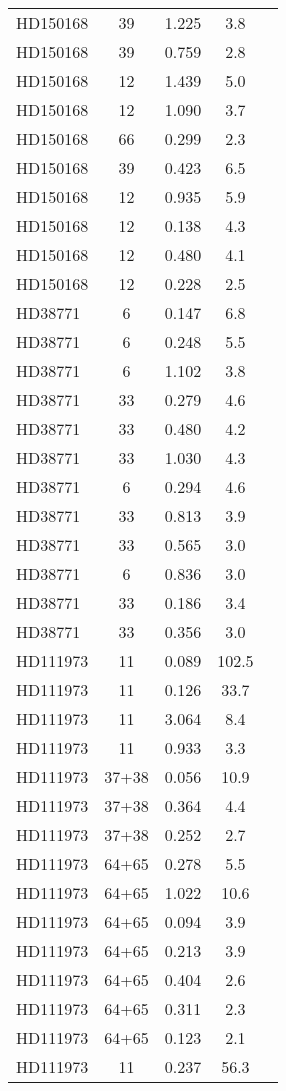 \begin{table*}
\begin{tabular}{l c c c c}
HD150168 & 39 & 1.225 & 3.8\\ 
HD150168 & 39 & 0.759 & 2.8\\ 
HD150168 & 12 & 1.439 & 5.0\\ 
HD150168 & 12 & 1.090 & 3.7\\ 
HD150168 & 66 & 0.299 & 2.3\\ 
HD150168 & 39 & 0.423 & 6.5\\ 
HD150168 & 12 & 0.935 & 5.9\\ 
HD150168 & 12 & 0.138 & 4.3\\ 
HD150168 & 12 & 0.480 & 4.1\\ 
HD150168 & 12 & 0.228 & 2.5\\ 
\hline
HD38771 & 6 & 0.147 & 6.8\\ 
HD38771 & 6 & 0.248 & 5.5\\ 
HD38771 & 6 & 1.102 & 3.8\\ 
HD38771 & 33 & 0.279 & 4.6\\ 
HD38771 & 33 & 0.480 & 4.2\\ 
HD38771 & 33 & 1.030 & 4.3\\ 
HD38771 & 6 & 0.294 & 4.6\\ 
HD38771 & 33 & 0.813 & 3.9\\ 
HD38771 & 33 & 0.565 & 3.0\\ 
HD38771 & 6 & 0.836 & 3.0\\ 
HD38771 & 33 & 0.186 & 3.4\\ 
HD38771 & 33 & 0.356 & 3.0\\ 
\hline
HD111973 & 11 & 0.089 & 102.5\\ 
HD111973 & 11 & 0.126 & 33.7\\ 
HD111973 & 11 & 3.064 & 8.4\\ 
HD111973 & 11 & 0.933 & 3.3\\ 
HD111973 & 37+38 & 0.056 & 10.9\\ 
HD111973 & 37+38 & 0.364 & 4.4\\ 
HD111973 & 37+38 & 0.252 & 2.7\\ 
HD111973 & 64+65 & 0.278 & 5.5\\ 
HD111973 & 64+65 & 1.022 & 10.6\\ 
HD111973 & 64+65 & 0.094 & 3.9\\ 
HD111973 & 64+65 & 0.213 & 3.9\\ 
HD111973 & 64+65 & 0.404 & 2.6\\ 
HD111973 & 64+65 & 0.311 & 2.3\\ 
HD111973 & 64+65 & 0.123 & 2.1\\ 
HD111973 & 11 & 0.237 & 56.3\\ 

\end{tabular}
\end{table*}
